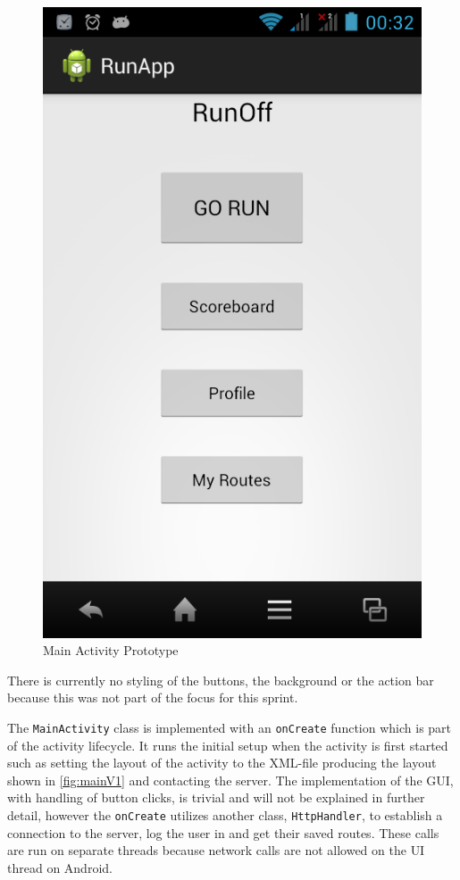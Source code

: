 \begin{figure}[!ht]
	\begin{center}
		\includegraphics[scale=0.4]{img/mainV1.png}
		\caption{Main Activity Prototype}
		\label{fig:mainV1}
	\end{center}
\end{figure}

There is currently no styling of the buttons, the background or the action bar because this was not part of the focus for this sprint. 

The \texttt{MainActivity} class is implemented with an \texttt{onCreate} function which is part of the activity lifecycle. It runs the initial setup when the activity is first started such as setting the layout of the activity to the \ac{XML}-file producing the layout shown in \autoref{fig:mainV1} and contacting the server. The implementation of the \ac{GUI}, with handling of button clicks, is trivial and will not be explained in further detail, however the \texttt{onCreate} utilizes another class, \texttt{HttpHandler}, to establish a connection to the server, log the user in and get their saved routes. These calls are run on separate threads because network calls are not allowed on the \ac{UI} thread on Android. 

